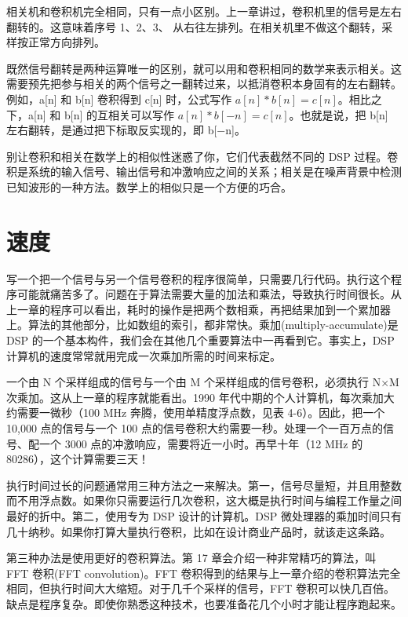 相关机和卷积机完全相同，只有一点小区别。上一章讲过，卷积机里的信号是左右翻转的。这意味着序号
1、2、3、
从右往左排列。在相关机里不做这个翻转，采样按正常方向排列。

既然信号翻转是两种运算唯一的区别，就可以用和卷积相同的数学来表示相关。这需要预先把参与相关的两个信号之一翻转过来，以抵消卷积本身固有的左右翻转。例如，a{[}n{]}
和 b{[}n{]} 卷积得到 c{[}n{]} 时，公式写作
\(a[n] * b[n] = c[n]\)。相比之下，a{[}n{]} 和 b{[}n{]} 的互相关可以写作
\(a[n] * b[-n] = c[n]\)。也就是说，把 b{[}n{]}
左右翻转，是通过把下标取反实现的，即 b{[}−n{]}。

别让卷积和相关在数学上的相似性迷惑了你，它们代表截然不同的 DSP
过程。卷积是系统的输入信号、输出信号和冲激响应之间的关系；相关是在噪声背景中检测已知波形的一种方法。数学上的相似只是一个方便的巧合。

\section{速度}

写一个把一个信号与另一个信号卷积的程序很简单，只需要几行代码。执行这个程序可能就痛苦多了。问题在于算法需要大量的加法和乘法，导致执行时间很长。从上一章的程序可以看出，耗时的操作是把两个数相乘，再把结果加到一个累加器上。算法的其他部分，比如数组的索引，都非常快。乘加(multiply-accumulate)是
DSP 的一个基本构件，我们会在其他几个重要算法中一再看到它。事实上，DSP
计算机的速度常常就用完成一次乘加所需的时间来标定。

一个由 N 个采样组成的信号与一个由 M 个采样组成的信号卷积，必须执行 N×M
次乘加。这从上一章的程序就能看出。1990
年代中期的个人计算机，每次乘加大约需要一微秒（100 MHz
奔腾，使用单精度浮点数，见表 4-6）。因此，把一个 10,000 点的信号与一个
100 点的信号卷积大约需要一秒。处理一个一百万点的信号、配一个 3000
点的冲激响应，需要将近一小时。再早十年（12 MHz 的
80286），这个计算需要三天！

执行时间过长的问题通常用三种方法之一来解决。第一，信号尽量短，并且用整数而不用浮点数。如果你只需要运行几次卷积，这大概是执行时间与编程工作量之间最好的折中。第二，使用专为
DSP 设计的计算机。DSP
微处理器的乘加时间只有几十纳秒。如果你打算大量执行卷积，比如在设计商业产品时，就该走这条路。

第三种办法是使用更好的卷积算法。第 17 章会介绍一种非常精巧的算法，叫 FFT
卷积(FFT convolution)。FFT
卷积得到的结果与上一章介绍的卷积算法完全相同，但执行时间大大缩短。对于几千个采样的信号，FFT
卷积可以快几百倍。缺点是程序复杂。即使你熟悉这种技术，也要准备花几个小时才能让程序跑起来。
